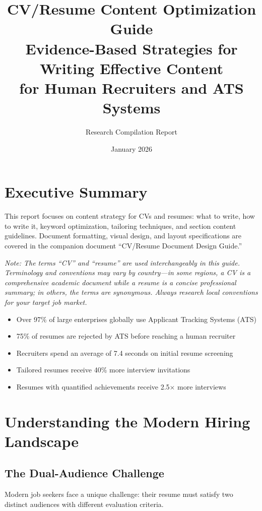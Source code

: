 \documentclass[11pt,a4paper]{article}
\title{\textbf{CV/Resume Content Optimization Guide}\\[0.5em]
\large Evidence-Based Strategies for Writing Effective Content\\
for Human Recruiters and ATS Systems}
\author{Research Compilation Report}
\date{January 2026}
\begin{document}
\maketitle
\tableofcontents
\newpage

\section{Executive Summary}

This report focuses on content strategy for CVs and resumes: what to write, how to write it, keyword optimization, tailoring techniques, and section content guidelines. Document formatting, visual design, and layout specifications are covered in the companion document ``CV/Resume Document Design Guide.''

\textit{Note: The terms ``CV'' and ``resume'' are used interchangeably in this guide. Terminology and conventions may vary by country---in some regions, a CV is a comprehensive academic document while a resume is a concise professional summary; in others, the terms are synonymous. Always research local conventions for your target job market.}

\begin{keystat}
\begin{itemize}[noitemsep]
    \item Over 97\% of large enterprises globally use Applicant Tracking Systems (ATS)
    \item 75\% of resumes are rejected by ATS before reaching a human recruiter
    \item Recruiters spend an average of 7.4 seconds on initial resume screening
    \item Tailored resumes receive 40\% more interview invitations
    \item Resumes with quantified achievements receive 2.5$\times$ more interviews
\end{itemize}
\end{keystat}

\section{Understanding the Modern Hiring Landscape}

\subsection{The Dual-Audience Challenge}

Modern job seekers face a unique challenge: their resume must satisfy two distinct audiences with different evaluation criteria.
\end{document}

